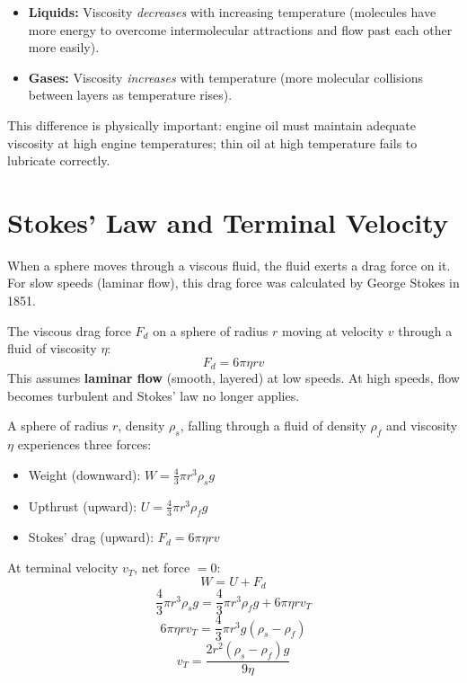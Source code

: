 \begin{keybox}
\begin{itemize}[noitemsep]
  \item \textbf{Liquids:} Viscosity \textit{decreases}
  with increasing temperature (molecules have more
  energy to overcome intermolecular attractions and
  flow past each other more easily).
  \item \textbf{Gases:} Viscosity \textit{increases}
  with temperature (more molecular collisions between
  layers as temperature rises).
\end{itemize}
This difference is physically important: engine oil
must maintain adequate viscosity at high engine
temperatures; thin oil at high temperature fails to
lubricate correctly.
\end{keybox}

\section{Stokes' Law and Terminal Velocity}

When a sphere moves through a viscous fluid, the fluid
exerts a drag force on it. For slow speeds (laminar
flow), this drag force was calculated by George Stokes
in 1851.

\begin{lawbox}
The viscous drag force $F_d$ on a sphere of radius
$r$ moving at velocity $v$ through a fluid of
viscosity $\eta$:
\[
  F_d = 6\pi\eta r v
\]
This assumes \textbf{laminar flow} (smooth, layered)
at low speeds. At high speeds, flow becomes turbulent
and Stokes' law no longer applies.
\end{lawbox}

\begin{processbox}
A sphere of radius $r$, density $\rho_s$, falling
through a fluid of density $\rho_f$ and viscosity $\eta$
experiences three forces:

\begin{itemize}[noitemsep]
  \item Weight (downward):
  $W = \frac{4}{3}\pi r^3 \rho_s g$
  \item Upthrust (upward):
  $U = \frac{4}{3}\pi r^3 \rho_f g$
  \item Stokes' drag (upward):
  $F_d = 6\pi\eta r v$
\end{itemize}

At terminal velocity $v_T$, net force $= 0$:
\[
  W = U + F_d
\]
\[
  \frac{4}{3}\pi r^3 \rho_s g
  = \frac{4}{3}\pi r^3 \rho_f g + 6\pi\eta r v_T
\]
\[
  6\pi\eta r v_T
  = \frac{4}{3}\pi r^3 g(\rho_s - \rho_f)
\]
\[
  \boxed{v_T = \frac{2r^2(\rho_s - \rho_f)g}{9\eta}}
\]
\end{processbox}

